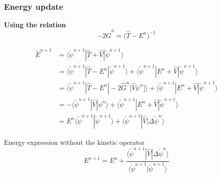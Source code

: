 \documentclass[mathserif, 10pt]{beamer}
\begin{document}
\begin{frame}
    \frametitle{Energy update}
    \centering
    \textbf{Using the relation}
    \begin{equation}
        \nonumber
        -2\hat{G}^n = \big(\hat{T} - E^n\big)^{-1}
    \end{equation}

    \vspace{5mm}

    \begin{align}
        \tilde{E}^{n+1}
        \nonumber
        &=	\langle\tilde{\psi}^{n+1}| \hat{T}+\hat{V} | \tilde{\psi}^{n+1}\rangle\\
        \nonumber
        &=	\langle\tilde{\psi}^{n+1}|  \hat{T} - E^n  | \tilde{\psi}^{n+1}\rangle
        +	\langle\tilde{\psi}^{n+1}|  E^n + \hat{V}  | \tilde{\psi}^{n+1}\rangle\\
        \nonumber
        &=	\langle\tilde{\psi}^{n+1}|  \hat{T} - E^n  | 
	        -2\hat{G}^n\big[\hat{V}\psi^n\big]\rangle
        +	\langle\tilde{\psi}^{n+1}| E^n + \hat{V} |\tilde{\psi}^{n+1}\rangle\\
        \nonumber
        &= -\langle\tilde{\psi}^{n+1}| \hat{V} |\psi^{n}\rangle
        +	\langle\tilde{\psi}^{n+1}| E^n + \hat{V} |\tilde{\psi}^{n+1}\rangle\\
        \nonumber
        &= E^{n}\langle\tilde{\psi}^{n+1}|\tilde{\psi}^{n+1}\rangle + 
	    \langle\tilde{\psi}^{n+1}| \hat{V} |\Delta\tilde{\psi}^{n}\rangle
    \end{align}

    \vspace{8mm}

    \centering
    Energy expression without the kinetic operator
    \begin{equation}
        \nonumber
        E^{n+1} = E^{n} + 
        \frac{\langle\tilde{\psi}^{n+1}| \hat{V} |\Delta\tilde{\psi}^{n}\rangle}
        {\langle\tilde{\psi}^{n+1}|\tilde{\psi}^{n+1}\rangle}
    \end{equation}
\end{frame}
\end{document}
